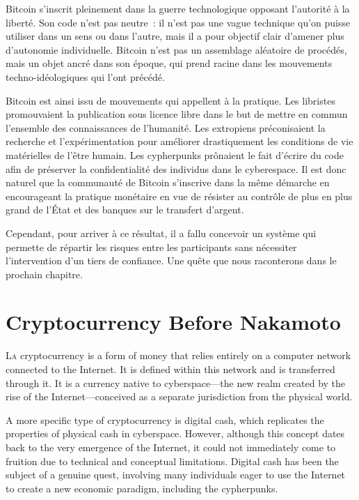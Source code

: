 \documentclass[
  a5paper,
  smalldemyvopaper,10pt,twoside,onecolumn,openright,extrafontsizes,hidelinks]{memoir}
\begin{document}

Bitcoin s'inscrit pleinement dans la guerre technologique opposant
l'autorité à la liberté. Son code n'est pas neutre~: il n'est pas une
vague technique qu'on puisse utiliser dans un sens ou dans l'autre, mais
il a pour objectif clair d'amener plus d'autonomie individuelle. Bitcoin
n'est pas un assemblage aléatoire de procédés, mais un objet ancré dans
son époque, qui prend racine dans les mouvements techno-idéologiques qui
l'ont précédé.

Bitcoin est ainsi issu de mouvements qui appellent à la pratique. Les
libristes promouvaient la publication sous licence libre dans le but de
mettre en commun l'ensemble des connaissances de l'humanité. Les
extropiens préconisaient la recherche et l'expérimentation pour
améliorer drastiquement les conditions de vie matérielles de l'être
humain. Les cypherpunks prônaient le fait d'écrire du code afin de
préserver la confidentialité des individus dans le cyberespace. Il est
donc naturel que la communauté de Bitcoin s'inscrive dans la même
démarche en encourageant la pratique monétaire en vue de résister au
contrôle de plus en plus grand de l'État et des banques sur le transfert
d'argent.

Cependant, pour arriver à ce résultat, il a fallu concevoir un système
qui permette de répartir les risques entre les participants sans
nécessiter l'intervention d'un tiers de confiance. Une quête que nous
raconterons dans le prochain chapitre.


\chapter{Cryptocurrency Before Nakamoto}\label{ch:cryptocurrency}

\label{enotezch:6}{}

{L}\textsc{a} cryptocurrency is a form of money that relies entirely on
a computer network connected to the Internet. It is defined within this
network and is transferred through it. It is a currency native to
cyberspace---the new realm created by the rise of the
Internet---conceived as a separate jurisdiction from the physical world.

A more specific type of cryptocurrency is digital cash, which replicates
the properties of physical cash in cyberspace. However, although this
concept dates back to the very emergence of the Internet, it could not
immediately come to fruition due to technical and conceptual
limitations. Digital cash has been the subject of a genuine quest,
involving many individuals eager to use the Internet to create a new
economic paradigm, including the cypherpunks.
\end{document}
